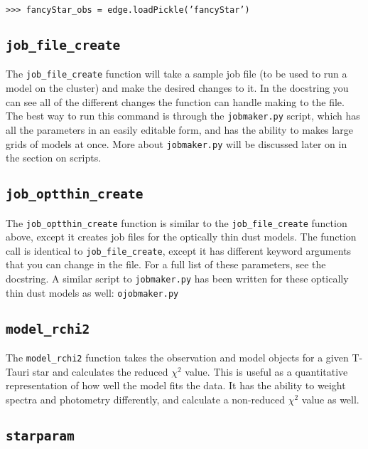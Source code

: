 \documentclass{article}
\begin{document}
\vspace{2mm}
\texttt{>>> fancyStar\_obs = edge.loadPickle('fancyStar')}
\vspace{2mm}

\subsection{\texttt{job\_file\_create}}

The \texttt{job\_file\_create} function will take a sample job file (to be used to run a model on the cluster) and make the desired changes to it. In the docstring you can see all of the different changes the function can handle making to the file. The best way to run this command is through the \texttt{jobmaker.py} script, which has all the parameters in an easily editable form, and has the ability to makes large grids of models at once. More about \texttt{jobmaker.py} will be discussed later on in the section on scripts.


\subsection{\texttt{job\_optthin\_create}}
The \texttt{job\_optthin\_create} function is similar to the \texttt{job\_file\_create} function above, except it creates job files for the optically thin dust models. The function call is identical to \texttt{job\_file\_create}, except it has different keyword arguments that you can change in the file. For a full list of these parameters, see the docstring. A similar script to \texttt{jobmaker.py} has been written for these optically thin dust models as well: \texttt{ojobmaker.py}


\subsection{\texttt{model\_rchi2}}
 
The \texttt{model\_rchi2} function takes the observation and model objects for a given T-Tauri star and calculates the reduced $\chi^2$ value. This is useful as a quantitative representation of how well the model fits the data. It has the ability to weight spectra and photometry differently, and calculate a non-reduced $\chi^2$ value as well. 

\subsection{\texttt{starparam}}
\end{document}
